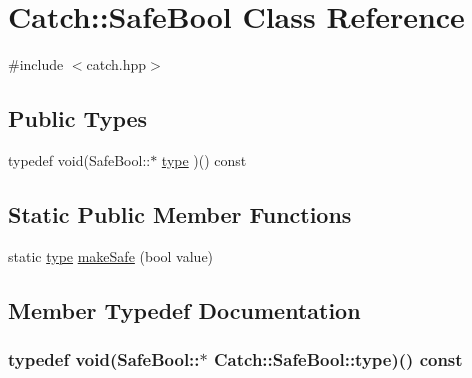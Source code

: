 \hypertarget{classCatch_1_1SafeBool}{\section{Catch\-:\-:Safe\-Bool Class Reference}
\label{classCatch_1_1SafeBool}
}


{\ttfamily \#include $<$catch.\-hpp$>$}

\subsection*{Public Types}
\begin{DoxyCompactItemize}
\item 
typedef void(Safe\-Bool\-::$\ast$ \hyperlink{classCatch_1_1SafeBool_a14cd49eced5b255a1f59512d3b9395ae}{type} )() const 
\end{DoxyCompactItemize}
\subsection*{Static Public Member Functions}
\begin{DoxyCompactItemize}
\item 
static \hyperlink{classCatch_1_1SafeBool_a14cd49eced5b255a1f59512d3b9395ae}{type} \hyperlink{classCatch_1_1SafeBool_af0ea63d9820f8bf7a8b76377913c4e77}{make\-Safe} (bool value)
\end{DoxyCompactItemize}


\subsection{Member Typedef Documentation}
\hypertarget{classCatch_1_1SafeBool_a14cd49eced5b255a1f59512d3b9395ae}{
\subsubsection[{type}]{\setlength{\rightskip}{0pt plus 5cm}typedef void(Safe\-Bool\-::$\ast$ Catch\-::\-Safe\-Bool\-::type)() const }}\label{classCatch_1_1SafeBool_a14cd49eced5b255a1f59512d3b9395ae}


